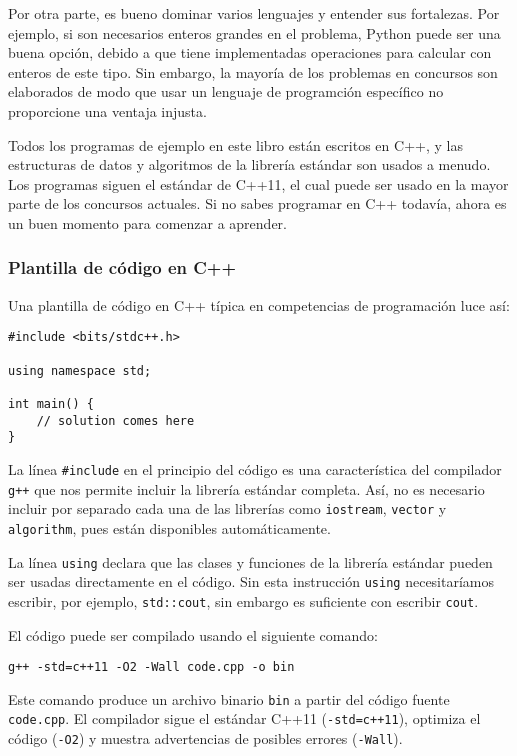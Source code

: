 Por otra parte, es bueno dominar varios lenguajes
y entender sus fortalezas. Por ejemplo, si son
necesarios enteros grandes en el problema,
Python puede ser una buena opci\'on, debido
a que tiene implementadas operaciones para
calcular con enteros de este tipo.
Sin embargo, la mayor\'ia de los problemas
en concursos son elaborados de modo que usar
un lenguaje de programci\'on espec\'ifico
no proporcione una ventaja injusta.

Todos los programas de ejemplo en este libro est\'an
escritos en C++, y las estructuras de datos y
algoritmos de la librer\'ia est\'andar son usados
a menudo. Los programas siguen el est\'andar de C++11,
el cual puede ser usado en la mayor parte de los
concursos actuales. Si no sabes programar en
C++ todav\'ia, ahora es un buen momento
para comenzar a aprender.

\subsubsection{Plantilla de c\'odigo en C++}

Una plantilla de c\'odigo en C++ t\'ipica en competencias
de programaci\'on luce as\'i:

\begin{lstlisting}
#include <bits/stdc++.h>

using namespace std;

int main() {
    // solution comes here
}
\end{lstlisting}

La l\'inea \texttt{\#include} en el principio
del c\'odigo es una caracter\'istica del compilador
\texttt{g++} que nos permite incluir la librer\'ia
est\'andar completa. As\'i, no es necesario incluir
por separado cada una de las librer\'ias como
\texttt{iostream}, \texttt{vector} y \texttt{algorithm},
pues est\'an disponibles autom\'aticamente.

La l\'inea \texttt{using} declara que las clases
y funciones de la librer\'ia est\'andar pueden ser
usadas directamente en el c\'odigo. Sin esta
instrucci\'on \texttt{using} necesitar\'iamos
escribir, por ejemplo, \texttt{std::cout},
sin embargo es suficiente con escribir \texttt{cout}.

El c\'odigo puede ser compilado usando el siguiente
comando:

\begin{lstlisting}
g++ -std=c++11 -O2 -Wall code.cpp -o bin
\end{lstlisting}

Este comando produce un archivo binario \texttt{bin}
a partir del c\'odigo fuente \texttt{code.cpp}.
El compilador sigue el est\'andar C++11 (\texttt{-std=c++11}),
optimiza el c\'odigo (\texttt{-O2})
y muestra advertencias de posibles errores (\texttt{-Wall}).

